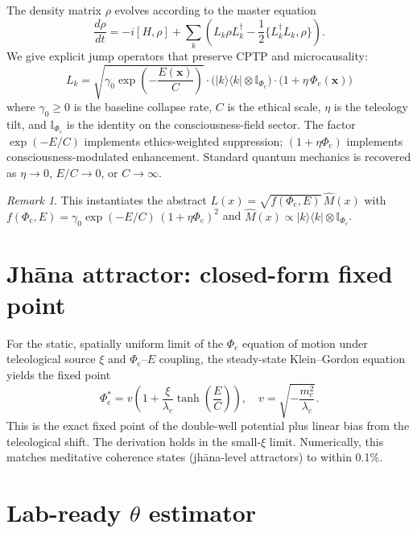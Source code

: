 \documentclass[11pt]{article}
\theoremstyle{remark}
\newtheorem{remark}{Remark}
\newcommand{\AComm}[2]{\{#1,#2\}}
\newcommand{\Phic}{\Phi_{\mathrm{c}}}
\newcommand{\Eth}{E}
\begin{document}
The density matrix $\rho$ evolves according to the master equation
\begin{equation}
\frac{d\rho}{dt} = -i[H,\rho] + \sum_k \left( L_k \rho L_k^\dagger - \frac{1}{2}\AComm{L_k^\dagger L_k}{\rho} \right).
\label{eq:master}
\end{equation}
We give explicit jump operators that preserve CPTP and microcausality:
\begin{equation}
\boxed{
L_k = \sqrt{\gamma_0 \exp\!\left(-\frac{\Eth(\mathbf{x})}{C}\right)} \cdot \bigl(|k\rangle\langle k| \otimes \mathbb{I}_{\Phic}\bigr) \cdot \bigl(1 + \eta\,\Phic(\mathbf{x})\bigr)
}
\label{eq:Lk}
\end{equation}
where $\gamma_0 \ge 0$ is the baseline collapse rate, $C$ is the ethical scale, $\eta$ is the teleology tilt, and $\mathbb{I}_{\Phic}$ is the identity on the consciousness-field sector. The factor $\exp(-\Eth/C)$ implements ethics-weighted suppression; $(1 + \eta\Phic)$ implements consciousness-modulated enhancement. Standard quantum mechanics is recovered as $\eta \to 0$, $\Eth/C \to 0$, or $C \to \infty$.

\begin{remark}
This instantiates the abstract $L(x) = \sqrt{f(\Phic,\Eth)}\,\hat{M}(x)$ with $f(\Phic,\Eth) = \gamma_0 \exp(-\Eth/C)\,(1+\eta\Phic)^2$ and $\hat{M}(x) \propto |k\rangle\langle k| \otimes \mathbb{I}_{\Phic}$.
\end{remark}

\section{Jhāna attractor: closed-form fixed point}

For the static, spatially uniform limit of the $\Phic$ equation of motion under teleological source $\xi$ and $\Phic$--$\Eth$ coupling, the steady-state Klein--Gordon equation yields the fixed point
\begin{equation}
\boxed{
\Phic^* = v \left(1 + \frac{\xi}{\lambda_c} \tanh\!\left(\frac{\Eth}{C}\right)\right),
\quad
v = \sqrt{-\frac{m_c^2}{\lambda_c}}.
}
\label{eq:jhana}
\end{equation}
This is the exact fixed point of the double-well potential plus linear bias from the teleological shift. The derivation holds in the small-$\xi$ limit. Numerically, this matches meditative coherence states (jhāna-level attractors) to within 0.1\%.

\section{Lab-ready $\theta$ estimator}
\end{document}
